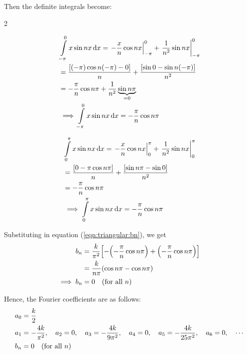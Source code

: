 \begin{itemize}
            Then the definite integrals become:\vspace{-3ex}
            \begin{multicols}{2}

                \begin{align*}
                    &\int\limits_{-\pi}^{0}{x\sin{nx}\dd{x}}=\left.-\dfrac{x}{n}\cos{nx}\right|_{-\pi}^{0}+\left.\dfrac{1}{n^2}\sin{nx}\right|_{-\pi}^{0} \\
                    &=\dfrac{\qty[(-\pi)\cos{n(-\pi)-0}]}{n}+\dfrac{\qty[\sin{0}-\sin{n(-\pi)}]}{n^2} \\
                    &=-\dfrac{\pi}{n}\cos{n\pi}+\dfrac{1}{n^2}\underbrace{\sin{n\pi}}_{=0} \\
                    &\implies\int\limits_{-\pi}^{0}{x\sin{nx}\dd{x}}=-\dfrac{\pi}{n}\cos{n\pi}
                \end{align*}

                \begin{align*}
                    &\int\limits_{0}^{\pi}{x\sin{nx}\dd{x}}=\left.-\dfrac{x}{n}\cos{nx}\right|_{0}^{\pi}+\left.\dfrac{1}{n^2}\sin{nx}\right|_{0}^{\pi} \\
                    &=\dfrac{\qty[0-\pi\cos{n\pi}]}{n}+\dfrac{\qty[\sin{n\pi}-\sin{0}]}{n^2} \\
                    &=-\dfrac{\pi}{n}\cos{n\pi} \\
                    &\implies\int\limits_{0}^{\pi}{x\sin{nx}\dd{x}}=-\dfrac{\pi}{n}\cos{n\pi}
                \end{align*}
                
            \end{multicols}

            Substituting in equation (\ref{eqn:triangular:bn}), we get
            \begin{align*}
                b_n&=\dfrac{k}{\pi^2}\qty[-\qty(-\dfrac{\pi}{n}\cos{n\pi})+\qty(-\dfrac{\pi}{n}\cos{n\pi})] \\
                    &=\dfrac{k}{n\pi}\qty(\cos{n\pi}-\cos{n\pi}) \\
                \implies b_n&=0\qq{(for all $n$)}
            \end{align*}
        \end{itemize}

        Hence, the Fourier coefficients are as follows:
        \begin{align*}
            a_0&=\dfrac{k}{2} \\
            a_1&=-\dfrac{4k}{\pi^2},\quad a_2=0,\quad a_3=-\dfrac{4k}{9\pi^2},\quad a_4=0,\quad a_5=-\dfrac{4k}{25\pi^2},\quad a_6=0,\quad\cdots \\
            b_n&=0\qq{(for all $n$)}
        \end{align*}

